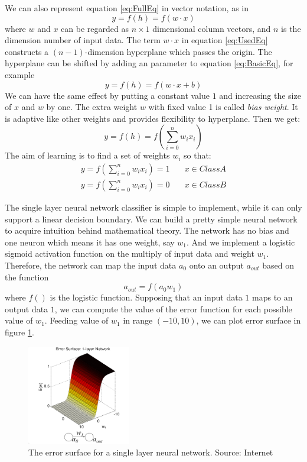 We can also represent equation \ref{eq:FullEq} in vector notation, as in 
\begin{equation}\label{eq:UsedEq}
y = f(h) = f(w \cdot x)
\end{equation}
where $w$ and $x$ can be regarded as $n\times1$ dimensional column vectors, and $n$ is the dimension number of input data.
The term $w \cdot x$ in equation \ref{eq:UsedEq} constructs a $(n-1)$-dimension hyperplane which passes the origin. The hyperplane can be shifted by adding an parameter to equation \ref{eq:BasicEq}, for example
\begin{equation}\label{eq:WithBias}
y = f(h) = f(w \cdot x + b)
\end{equation}
We can have the same effect by putting a constant value $1$ and increasing the size of $x$ and $w$ by one. The extra weight $w$ with fixed value 1 is called \textit{bias weight}. It is adaptive like other weights and provides flexibility to hyperplane. Then we get:
\begin{equation}\label{eq:finalEq}
y = f(h) = f(\sum_{i=0}^{n}w_{i}x_{i})
\end{equation}
The aim of learning is to find a set of weights $w_{i}$ so that:
\begin{align*}
y = f(\sum_{i=0}^{n}w_{i}x_{i}) = 1  & \quad x \in Class A\\
y = f(\sum_{i=0}^{n}w_{i}x_{i}) = 0  & \quad x \in Class B
\end{align*}

The single layer neural network classifier is simple to implement, while it can only support a linear decision boundary. We can build a pretty simple neural network to acquire intuition behind mathematical theory. The network has no bias and one neuron which means it has one weight, say $w_{1}$. And we implement a logistic sigmoid activation function on the multiply of input data and weight $w_{1}$. Therefore, the network can map the input data $a_0$ onto an output $a_{out}$ based on the function
\begin{equation}\label{eq:1LayerExample}
a_{out} = f(a_{0}w_{1})
\end{equation}
where $f()$ is the logistic function. Supposing that an input data $1$ maps to an output data $1$, we can compute the value of the error function for each possible value of $w_{1}$. Feeding value of $w_{1}$ in range $(-10,10)$, we can plot error surface in figure \ref{fig:1LayerErrorSurface}.
\graphicspath{ {./Figures/} }
\begin{figure}[!htb]
\centering
\includegraphics[width=0.4\textwidth]{1LayerErrorSurface.png}
\caption{\label{fig:1LayerErrorSurface}The error surface for a single layer neural network. Source: Internet}
\end{figure}

